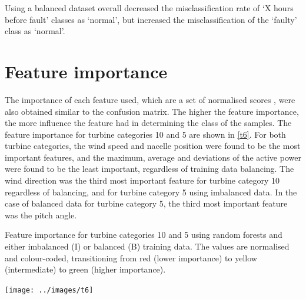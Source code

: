 Using a balanced dataset overall decreased the misclassification rate of `X hours before fault' classes as `normal', but increased the misclassification of the `faulty' class as `normal'.

\section{Feature importance}

The importance of each feature used, which are a set of normalised scores \cite{Rudy13}, were also obtained similar to the confusion matrix. The higher the feature importance, the more influence the feature had in determining the class of the samples. The feature importance for turbine categories 10 and 5 are shown in \autoref{t6}. For both turbine categories, the wind speed and nacelle position were found to be the most important features, and the maximum, average and deviations of the active power were found to be the least important, regardless of training data balancing. The wind direction was the third most important feature for turbine category 10 regardless of balancing, and for turbine category 5 using imbalanced data. In the case of balanced data for turbine category 5, the third most important feature was the pitch angle.

\begin{table}
  \centering
  \caption{\label{t6}Feature importance for turbine categories 10 and 5 using random forests and either imbalanced (I) or balanced (B) training data. The values are normalised and colour-coded, transitioning from red (lower importance) to yellow (intermediate) to green (higher importance).}
  \texttt{[image: ../images/t6]}
\end{table}
